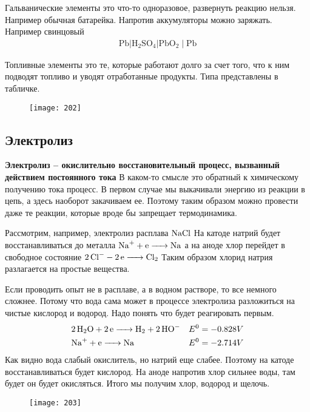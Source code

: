 	Гальванические элементы это что-то одноразовое, развернуть реакцию нельзя. Например обычная батарейка. Напротив аккумуляторы можно заряжать. Например свинцовый 
	\begin{align*}
	\mathrm{Pb}\left|\mathrm{H}_{2} \mathrm{SO}_{4}\right| \mathrm{PbO}_{2} \mid \mathrm{Pb}
	\end{align*}
	
	Топливные элементы это те, которые работают долго за счет того, что к ним подводят топливо и уводят отработанные продукты. Типа представлены в табличке.
	\begin{figure}[H]
		\texttt{[image: 202]}
	\end{figure}
	\subsection{Электролиз}
	\textbf{Электролиз -- окислительно восстановительный процесс, вызванный действием постоянного тока}
	В каком-то смысле это обратный к химическому получению тока процесс. В первом случае мы выкачивали энергию из реакции в цепь, а здесь наоборот закачиваем ее. Поэтому таким образом можно провести даже те реакции, которые вроде бы запрещает термодинамика.
	
	Рассмотрим, например, электролиз расплава $\ce{NaCl}$
	На катоде натрий будет восстанавливаться до металла $\ce{Na^+ + e -> Na}$ а на аноде хлор перейдет в свободное состояние $\ce{2Cl^-  - 2e -> Cl_2}$	
	Таким образом хлорид натрия разлагается на простые вещества.
	
	Если проводить опыт не в расплаве, а в водном растворе, то все немного сложнее. Потому что вода сама может в процессе электролиза разложиться на чистые кислород и водород. Надо понять что будет реагировать первым.
	\begin{align*}
	&\ce{2H_2O + 2e -> H_2 + 2HO^-} &E^0 = - 0.828 V\\
	&\ce{Na^+ + e -> Na}  &E^0  = -2.714V
	\end{align*}
	Как видно вода слабый окислитель, но натрий еще слабее. Поэтому на катоде восстанавливаться будет кислород. На аноде напротив хлор сильнее воды, там будет он будет окисляться. Итого мы получим хлор, водород и щелочь.
	\begin{figure}[H]
		\texttt{[image: 203]}
	\end{figure}
